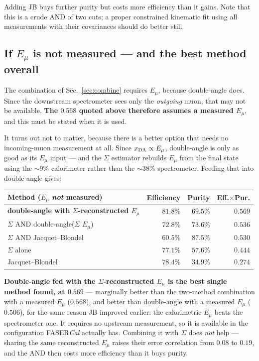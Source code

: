 \documentclass[11pt,a4paper]{article}
\newcommand{\Ein}{E_{\mu}}
\begin{document}
Adding JB buys further purity but costs more efficiency than it gains. Note that
this is a crude AND of two cuts; a proper constrained kinematic fit using all
measurements with their covariances should do better still.

\subsection{If $\Ein$ is not measured --- and the best method overall}
\label{sec:noein}

The combination of Sec.~\ref{sec:combine} requires $\Ein$, because double-angle
does. Since the downstream spectrometer sees only the \emph{outgoing} muon, that
may not be available. \textbf{The $0.568$ quoted above therefore assumes a
measured $\Ein$}, and this must be stated when it is used.

It turns out not to matter, because there is a better option that needs no
incoming-muon measurement at all. Since $x_{\rm DA}\propto\Ein$, double-angle is
only as good as its $\Ein$ input --- and the $\Sigma$ estimator rebuilds $\Ein$
from the final state using the $\sim\!9\%$ calorimeter rather than the
$\sim\!38\%$ spectrometer. Feeding that into double-angle gives:

\begin{center}\small
\begin{tabular}{lrrr}
\toprule
Method ($\Ein$ \emph{not} measured) & Efficiency & Purity & Eff.$\times$Pur. \\
\midrule
\textbf{double-angle with $\Sigma$-reconstructed $\Ein$} & $81.8\%$ & $69.5\%$ & $\mathbf{0.569}$ \\
$\Sigma$ AND double-angle($\Sigma$ $\Ein$) & $72.8\%$ & $73.6\%$ & $0.536$ \\
$\Sigma$ AND Jacquet--Blondel & $60.5\%$ & $87.5\%$ & $0.530$ \\
$\Sigma$ alone & $77.1\%$ & $57.6\%$ & $0.444$ \\
Jacquet--Blondel & $78.4\%$ & $34.9\%$ & $0.274$ \\
\bottomrule
\end{tabular}
\end{center}

\noindent
\textbf{Double-angle fed with the $\Sigma$-reconstructed $\Ein$ is the best
single method found, at $0.569$} --- marginally better than the two-method
combination with a measured $\Ein$ ($0.568$), and better than double-angle with
a measured $\Ein$ ($0.506$), for the same reason JB improved earlier: the
calorimetric $\Ein$ beats the spectrometer one. It requires no upstream
measurement, so it is available in the configuration FASER\emph{Cal} actually
has. Combining it with $\Sigma$ does \emph{not} help --- sharing the same
reconstructed $\Ein$ raises their error correlation from $0.08$ to $0.19$, and
the AND then costs more efficiency than it buys purity.
\end{document}
